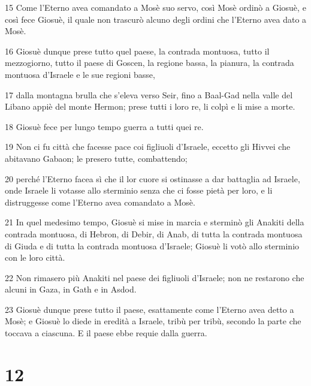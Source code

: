 \par 15 Come l'Eterno avea comandato a Mosè suo servo, così Mosè ordinò a Giosuè, e così fece Giosuè, il quale non trascurò alcuno degli ordini che l'Eterno avea dato a Mosè.
\par 16 Giosuè dunque prese tutto quel paese, la contrada montuosa, tutto il mezzogiorno, tutto il paese di Goscen, la regione bassa, la pianura, la contrada montuosa d'Israele e le sue regioni basse,
\par 17 dalla montagna brulla che s'eleva verso Seir, fino a Baal-Gad nella valle del Libano appiè del monte Hermon; prese tutti i loro re, li colpì e li mise a morte.
\par 18 Giosuè fece per lungo tempo guerra a tutti quei re.
\par 19 Non ci fu città che facesse pace coi figliuoli d'Israele, eccetto gli Hivvei che abitavano Gabaon; le presero tutte, combattendo;
\par 20 perché l'Eterno facea sì che il lor cuore si ostinasse a dar battaglia ad Israele, onde Israele li votasse allo sterminio senza che ci fosse pietà per loro, e li distruggesse come l'Eterno avea comandato a Mosè.
\par 21 In quel medesimo tempo, Giosuè si mise in marcia e sterminò gli Anakiti della contrada montuosa, di Hebron, di Debir, di Anab, di tutta la contrada montuosa di Giuda e di tutta la contrada montuosa d'Israele; Giosuè li votò allo sterminio con le loro città.
\par 22 Non rimasero più Anakiti nel paese dei figliuoli d'Israele; non ne restarono che alcuni in Gaza, in Gath e in Asdod.
\par 23 Giosuè dunque prese tutto il paese, esattamente come l'Eterno avea detto a Mosè; e Giosuè lo diede in eredità a Israele, tribù per tribù, secondo la parte che toccava a ciascuna. E il paese ebbe requie dalla guerra.

\chapter{12}

